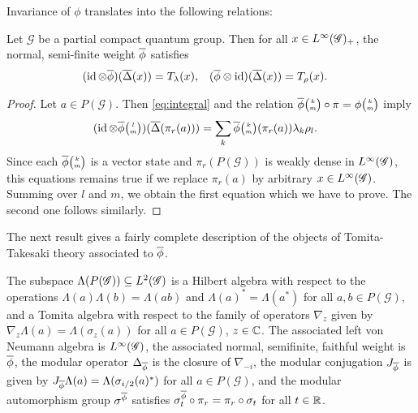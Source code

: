 Invariance of $\phi$ translates into the following relations:
\begin{Prop} \label{prop:vn-invariance}
  Let $\mathscr{G}$ be a partial compact quantum group. Then for all
  $x\in L^{\infty}(\mathscr{G})_{+}$, the
  normal, semi-finite weight $\overline{\phi}$ satisfies
  \begin{align*}
    (\operatorname{id} \otimes \overline{\phi})(\overline{\Delta}(x)) &=  T_{\lambda}(x), &
    (\overline{\phi} \otimes \operatorname{id})(\overline{\Delta}(x)) &= T_{\rho}(x).
  \end{align*}
\end{Prop}
\begin{proof}
  Let  $a \in P(\mathscr{G})$. Then 
 \eqref{eq:integral} and the relation
  $\overline{\phi}{\tiny {\begin{pmatrix} k\\m\end{pmatrix}}}\circ \pi = \phi{\tiny {\begin{pmatrix} k\\m\end{pmatrix}}}$ imply
  \begin{align*}
    (\operatorname{id} \otimes \overline{\phi}{\tiny {\begin{pmatrix} l\\m\end{pmatrix}}})(\overline{\Delta}(\pi_{r}(a))) &= \sum_{k}
    \overline{\phi}{\tiny {\begin{pmatrix} k\\m\end{pmatrix}}}(\pi_{r}(a)) \lambda_{k}\rho_{l}.
  \end{align*}
  Since each $\overline{\phi}{\tiny {\begin{pmatrix} k\\m\end{pmatrix}}}$ is a vector state and $\pi_{r}(P(\mathscr{G}))$ is
  weakly dense in $L^{\infty}(\mathscr{G})$,  this equations
  remains true if we replace $\pi_{r}(a)$ by arbitrary $x\in
  L^{\infty}(\mathscr{G})$. Summing over $l$ and $m$, we  obtain the first equation
  which we have to prove. The second one follows similarly.
\end{proof}
The next result gives a fairly complete description of the objects of
Tomita-Takesaki theory associated to $\overline{\phi}$.
\begin{Lem} \label{lemma:vn-hilbert} The subspace
  $\Lambda(P(\mathscr{G})) \subseteq L^{2}(\mathscr{G})$ is a Hilbert algebra with respect to
  the operations $\Lambda(a)\Lambda(b)=\Lambda(ab)$ and
  $\Lambda(a)^{*}= \Lambda(a^{*})$ for all $a,b\in P(\mathscr{G})$, and a Tomita
  algebra with respect to the family of operators $\nabla_{z}$ given
  by $\nabla_{z}\Lambda(a)=\Lambda(\sigma_{z}(a))$ for all $a\in P(\mathscr{G})$,
  $z\in \mathbb{C}$.  The associated left von Neumann
  algebra is $L^{\infty}(\mathscr{G})$, the associated normal, semifinite, faithful
  weight is $\overline{\phi}$, the modular operator  $\Delta_{\overline{\phi}}$ is the
  closure of $\nabla_{-i}$,  the modular conjugation $J_{\overline{\phi}}$ is
  given by $J_{\overline{\phi}}\Lambda(a)=\Lambda(\sigma_{i/2}(a)^{*})$ for all
  $a\in P(\mathscr{G})$, and the modular automorphism group $\sigma^{\overline{\phi}}$
  satisfies $\sigma^{\overline{\phi}}_{t} \circ \pi_{r} = \pi_{r} \circ
  \sigma_{t}$ for all $t\in \mathbb{R}$.
\end{Lem}
